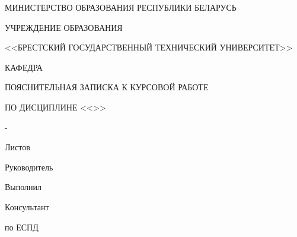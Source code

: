 \begin{center}
    МИНИСТЕРСТВО ОБРАЗОВАНИЯ РЕСПУБЛИКИ БЕЛАРУСЬ
    
    \hspace{0pt}

    УЧРЕЖДЕНИЕ ОБРАЗОВАНИЯ

    <<БРЕСТСКИЙ ГОСУДАРСТВЕННЫЙ ТЕХНИЧЕСКИЙ УНИВЕРСИТЕТ>>

    \hspace{0pt}

    КАФЕДРА \titlePageKafedra
\end{center}

\vfill

\begin{center}
    \titlePageTopic

    \hspace{0pt}

    ПОЯСНИТЕЛЬНАЯ ЗАПИСКА К КУРСОВОЙ РАБОТЕ

    ПО ДИСЦИПЛИНЕ <<\titlePageDistiplina>>
\end{center}

\vfill

\begin{center}
    \code-\codePZ

    \hspace{0pt}

    Листов \pageref{LastPage}
\end{center}

\vfill

\begin{flushright}
    \begin{minipage}[t]{.49\textwidth}
        \begin{minipage}[t]{.75\textwidth}
            \begin{flushright}
                Руководитель

                Выполнил

                Консультант

                по ЕСПД
            \end{flushright}
        \end{minipage}
    \end{minipage}
    \begin{minipage}[t]{.49\textwidth}
        \begin{flushright}
            \begin{minipage}[t]{.75\textwidth}
                \titlePageLeaderName~\titlePageLeaderSurname

                \titlePageAuthorName~\titlePageAuthorSurname

                \hspace{0pt}

                \titlePageConsultantName~\titlePageConsultantSurname

            \end{minipage}
        \end{flushright}
        
    \end{minipage}
\end{flushright}

\vfill

\begin{center}
    \ESKDtheYear
\end{center}